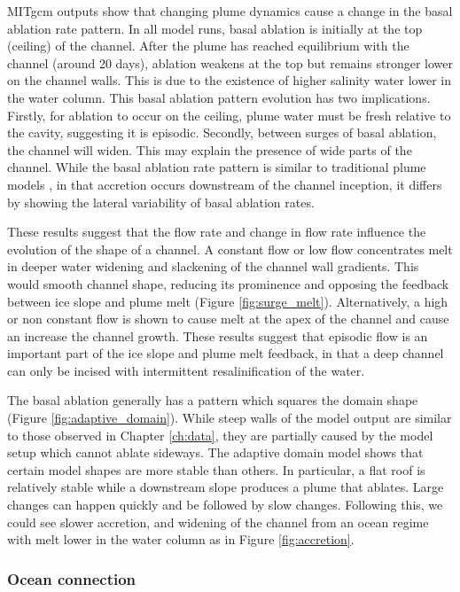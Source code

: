 MITgcm outputs show that changing plume dynamics cause a change in the basal ablation rate pattern. In all model runs, basal ablation is initially at the top (ceiling) of the channel. After the plume has reached equilibrium with the channel (around 20 days), ablation weakens at the top but remains stronger lower on the channel walls. This is due to the existence of higher salinity water lower in the water column. This basal ablation pattern evolution has two implications. Firstly, for ablation to occur on the ceiling, plume water must be fresh {relative} to the cavity, suggesting it is episodic. Secondly, between surges of basal ablation, the channel will widen. This may explain the presence of wide parts of the channel.
While the basal ablation rate pattern is similar to traditional plume models \citep[e.g.][]{jenkins2011convection}, in that accretion occurs downstream of the channel inception, it differs by showing the lateral variability of basal ablation rates. 

These results suggest that the flow rate and change in flow rate influence the evolution of the shape of a channel. A constant flow or low flow concentrates melt in deeper water widening and slackening of the channel wall gradients. This would smooth channel shape, reducing its prominence and opposing the feedback between ice slope and plume melt (Figure \ref{fig:surge_melt}). 
Alternatively, a high or non constant flow is shown to cause melt at the apex of the channel and cause an increase the channel growth. 
These results suggest that episodic flow is an important part of the ice slope and plume melt feedback, in that a deep channel can only be incised with intermittent resalinification of the water. 

The basal ablation generally has a pattern which squares the domain shape (Figure \ref{fig:adaptive_domain}). While steep walls of the model output are similar to those observed in Chapter \ref{ch:data}, they are partially caused by the model setup which cannot ablate sideways. The adaptive domain model shows that certain model shapes are more stable than others. In particular, a flat roof is relatively stable while a downstream slope produces a plume that ablates. Large changes can happen quickly and be followed by slow changes.  Following this, we could see slower accretion, and widening of the channel from an ocean regime with melt lower in the water column as in Figure \ref{fig:accretion}.

\subsubsection{Ocean connection}

